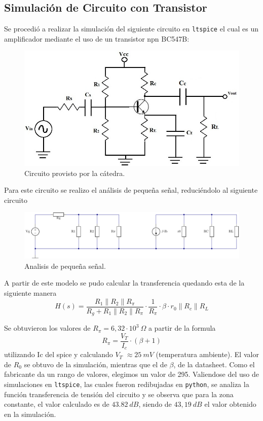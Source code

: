 \documentclass[a4paper]{article}
\begin{document}
\subsection*{Simulación de Circuito con Transistor}

Se procedió a realizar la simulación del siguiente circuito en \texttt{ltspice} el cual es un amplificador mediante el uso de un transistor npn BC547B:
\begin{figure}[H]
	\centering
	\includegraphics[width=0.6 \textwidth]{commonEmitter.jpg}	
	\caption{Circuito provisto por la cátedra.}
	\label{fig:cmnemitnpn}

\end{figure}

Para este circuito se realizo el análisis de pequeña señal, reduciéndolo al siguiente circuito
\begin{figure}[H]
	\centering
	\includegraphics[width=1 \textwidth]{CircEq.PNG}	
	\caption{Analisis de pequeña señal.}
	\label{fig:littleSignal}
\end{figure}

A partir de este modelo se pudo calcular la transferencia quedando esta de la siguiente manera \[H(s)=\frac{R_1\parallel R_2\parallel R_\pi}{R_g+R_1\parallel R_2\parallel R_\pi}\cdot \frac{1}{R_\pi} \cdot \beta \cdot r_0 \parallel R_c \parallel R_L  \]

Se obtuvieron los valores de $R_\pi = 6,32 \cdot 10^{3} \ \Omega$ a partir de la formula \[R_\pi = \frac{V_T}{I_c}\cdot (\beta +1) \] utilizando Ic del spice y calculando $V_T$ $\approx 25 \ mV$ (temperatura ambiente).
El valor de $R_0$ se obtuvo de la simulación, mientras que el de $\beta$, de la datasheet. Como el fabricante da un rango de valores, elegimos un valor de 295.
Valiendose del uso de simulaciones en \texttt{ltspice}, las cuales fueron redibujadas en \texttt{python}, se analiza la función transferencia de tensión del circuito y se observa que para la zona constante, el valor calculado es de $43.82 \ dB$, siendo de $43,19 \ dB$ el valor obtenido en la simulación.
\end{document}
